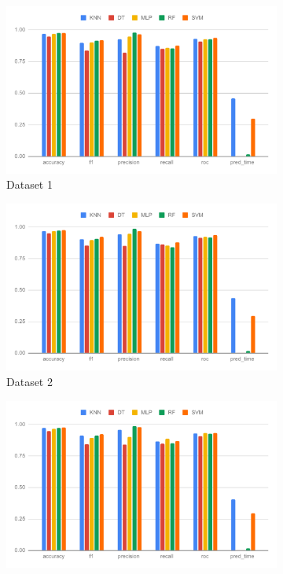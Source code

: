 \documentclass[a4paper,fleqn]{cas-dc}
\begin{document}
\begin{figure}[H]
    \begin{subfigure}{\columnwidth}
        \includegraphics[width=0.9\columnwidth]{perf_ds_1.pdf}
        \caption{Dataset 1}\label{fig:performance_results_dataset_1}
    \end{subfigure}
    \begin{subfigure}{\columnwidth}
        \includegraphics[width=0.9\columnwidth]{perf_ds_2.pdf}
        \caption{Dataset 2}\label{fig:performance_results_dataset_2}
    \end{subfigure}
    \begin{subfigure}{\columnwidth}
        \includegraphics[width=0.9\columnwidth]{perf_ds_3.pdf}

\end{subfigure}
\end{figure}
\end{document}
